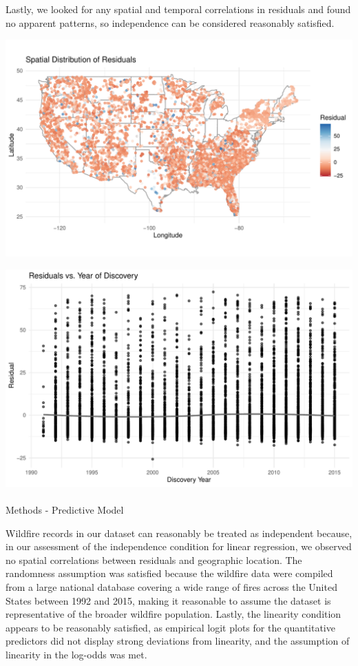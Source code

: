 \documentclass[
  letterpaper,
  DIV=11,
  numbers=noendperiod]{scrartcl}
\makeatletter
\let\oldparagraph\paragraph
\renewcommand{\paragraph}{
    \@ifstar
      \xxxParagraphStar
      \xxxParagraphNoStar
  }
\newcommand{\xxxParagraphStar}[1]{\oldparagraph*{#1}\mbox{}}
\newcommand{\xxxParagraphNoStar}[1]{\oldparagraph{#1}\mbox{}}
\makeatother
\begin{document}
Lastly, we looked for any spatial and temporal correlations in residuals
and found no apparent patterns, so independence can be considered
reasonably satisfied.

\includegraphics{written-report_files/figure-pdf/spatial-distribution-residuals-1.pdf}

\includegraphics{written-report_files/figure-pdf/spatial-distribution-residuals-2.pdf}

\paragraph{Methods - Predictive Model}\label{methods---predictive-model}

Wildfire records in our dataset can reasonably be treated as independent
because, in our assessment of the independence condition for linear
regression, we observed no spatial correlations between residuals and
geographic location. The randomness assumption was satisfied because the
wildfire data were compiled from a large national database covering a
wide range of fires across the United States between 1992 and 2015,
making it reasonable to assume the dataset is representative of the
broader wildfire population. Lastly, the linearity condition appears to
be reasonably satisfied, as empirical logit plots for the quantitative
predictors did not display strong deviations from linearity, and the
assumption of linearity in the log-odds was met.
\end{document}
